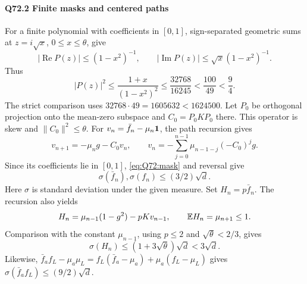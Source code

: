 \paragraph{Q72.2 Finite masks and centered paths}\label{part:Q72.2}
For a finite polynomial with coefficients in $[0,\allowbreak 1]$, sign-separated
geometric sums at $z=\allowbreak i\sqrt x$, $0\le\allowbreak  x\le\allowbreak \theta$, give
\[
 |\operatorname{Re}P(z)|\le(1-x^2)^{-1},\qquad
 |\operatorname{Im}P(z)|\le\sqrt x(1-x^2)^{-1}.
\]
Thus
\begin{equation}\tag{Q72.2.1}\label{eq:Q72:mask}
 |P(z)|^2\le\frac{1+x}{(1-x^2)^2}
 \le\frac{32768}{16245}<\frac{100}{49}<\frac94.
\end{equation}
The strict comparison uses $32768\cdot49=\allowbreak 1605632<\allowbreak 1624500$.
Let $P_0$ be orthogonal projection onto the mean-zero subspace and
$C_0=\allowbreak P_0KP_0$ there. This operator is skew and $\|C_0\|^2\le\allowbreak \theta$.
For $v_n=\allowbreak \bar f_n-\mu_n\mathbf1$, the path recursion gives
\begin{equation}\tag{Q72.2.2}\label{eq:Q72:centered-path}
 v_{n+1}=-\mu_ng-C_0v_n,\qquad
 v_n=-\sum_{j=0}^{n-1}\mu_{n-1-j}(-C_0)^jg.
\end{equation}
Since its coefficients lie in $[0,\allowbreak 1]$, \eqref{eq:Q72:mask} and reversal give
\begin{equation}\tag{Q72.2.3}\label{eq:Q72:path-sigma}
 \sigma(\bar f_n),\sigma(f_n)\le(3/2)\sqrt d.
\end{equation}
Here $\sigma$ is standard deviation under the given measure. Set
$H_n=\allowbreak p\bar f_n$. The recursion also yields
\[
 H_n=\mu_{n-1}(1-g^2)-pKv_{n-1},\qquad\mathbb E H_n=\mu_{n+1}\le1.
\]
Comparison with the constant $\mu_{n-1}$, using $p\le\allowbreak 2$ and
$\sqrt\theta<\allowbreak 2/3$, gives
\begin{equation}\tag{Q72.2.5}\label{eq:Q72:mass-sigma}
 \sigma(H_n)\le(1+3\sqrt\theta)\sqrt d<3\sqrt d.
\end{equation}
Likewise,
$\bar f_af_L-\mu_a\mu_L=\allowbreak f_L(\bar f_a-\mu_a)+\mu_a(f_L-\mu_L)$ gives
$\sigma(\bar f_af_L)\le\allowbreak (9/2)\sqrt d$.

